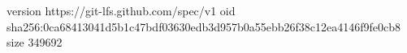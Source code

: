 version https://git-lfs.github.com/spec/v1
oid sha256:0ca68413041d5b1c47bdf03630edb3d957b0a55ebb26f38c12ea4146f9fe0cb8
size 349692
